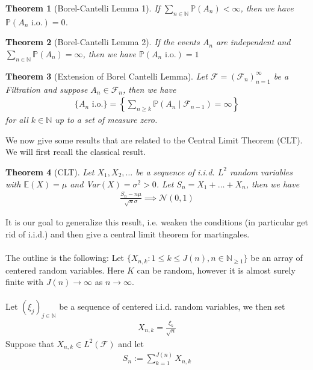 \documentclass[11pt,a4paper, final]{article}
\newtheorem{thm}{Theorem}[section]
\theoremstyle{definition}
\begin{document}
\begin{thm}[Borel-Cantelli Lemma 1] If $\sum_{n \in \mathbb{N}} \mathbb{P}(A_n) < \infty$, then we have $\mathbb{P}(A_n \text{ i.o.} )=0$.
\end{thm}
\begin{thm}[Borel-Cantelli Lemma 2] If the events $A_n$ are independent and $\sum_{n \in \mathbb{N}} \mathbb{P}(A_n) = \infty$, then we have $\mathbb{P}( A_n \text{ i.o.} ) = 1$ 
\end{thm}
\newpage
\begin{thm}[Extension of Borel Cantelli Lemma] Let $\mathcal{F}= (\mathcal{F}_n)_{n = 1}^\infty$ be a Filtration and suppose $A_n \in \mathcal{F}_n$, then we have
\begin{align*}
 \lbrace A_n \text{ i.o.}\rbrace = \left \lbrace \sum_{n \geq k} \mathbb{P}(A_n \mid \mathcal{F}_{n-1} ) = \infty \right \rbrace 
\end{align*}
for all $k \in \mathbb{N}$ up to a set of measure zero. 
\end{thm}
\noindent We now give some results that are related to the Central Limit Theorem (CLT). We will first recall the classical result.
\begin{thm}[CLT] Let $X_1, X_2, \dots$ be a sequence of i.i.d. $L^2$ random variables with $\mathbb{E}(X)= \mu$ and Var$(X)= \sigma^2 >0$. Let $S_n= X_1 + \dots + X_n$, then we have
\begin{align*}
\frac{S_n-n \mu }{\sqrt{n} \sigma} \implies \mathcal{N}(0,1) 
\end{align*}
\end{thm}
\noindent It is our goal to generalize this result, i.e. weaken the conditions (in particular get rid of i.i.d.) and then give a central limit theorem for martingales. 
\\\\
The outline is the following: Let $\lbrace X_{n,k} : 1 \leq k \leq J(n), n \in \mathbb{N}_{ \geq 1 } \rbrace$ be an array of centered random variables. Here $K$ can be random, however it is almost surely finite with $J(n) \to \infty$ as $n \to \infty$.  
\\\\
Let $( \xi_j)_{j \in \mathbb{N}}$ be a sequence of centered i.i.d. random variables, we then set 
\begin{align*}
X_{n,k} = \frac{\xi_k}{\sqrt{n}}
\end{align*}
Suppose that $X_{n,k} \in L^2( \mathcal{F})$ and let \begin{align*}
S_n := \sum_{k=1}^{J(n)} X_{n,k}
\end{align*}
\end{document}
